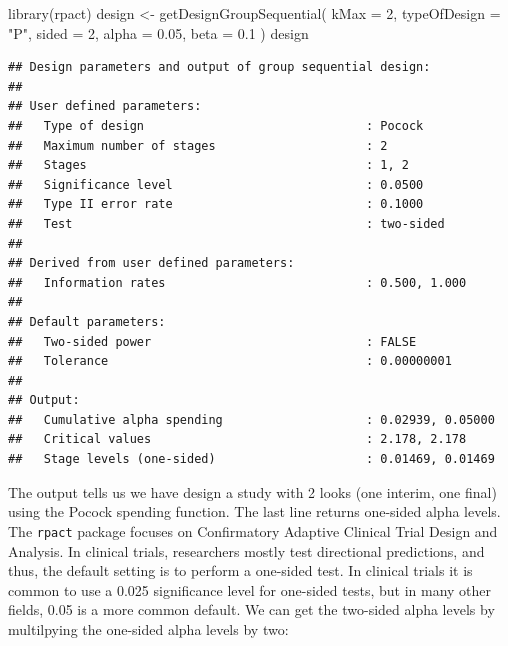 \documentclass[
  oneside]{book}
\newenvironment{Shaded}{\begin{snugshade}}{\end{snugshade}}
\newcommand{\AttributeTok}[1]{\textcolor[rgb]{0.77,0.63,0.00}{#1}}
\newcommand{\DecValTok}[1]{\textcolor[rgb]{0.00,0.00,0.81}{#1}}
\newcommand{\FloatTok}[1]{\textcolor[rgb]{0.00,0.00,0.81}{#1}}
\newcommand{\FunctionTok}[1]{\textcolor[rgb]{0.00,0.00,0.00}{#1}}
\newcommand{\NormalTok}[1]{#1}
\newcommand{\OtherTok}[1]{\textcolor[rgb]{0.56,0.35,0.01}{#1}}
\newcommand{\SpecialCharTok}[1]{\textcolor[rgb]{0.00,0.00,0.00}{#1}}
\newcommand{\StringTok}[1]{\textcolor[rgb]{0.31,0.60,0.02}{#1}}
\begin{document}
\begin{Shaded}
\begin{Highlighting}[]
\FunctionTok{library}\NormalTok{(rpact)}
\NormalTok{design }\OtherTok{\textless{}{-}} \FunctionTok{getDesignGroupSequential}\NormalTok{(}
  \AttributeTok{kMax =} \DecValTok{2}\NormalTok{,}
  \AttributeTok{typeOfDesign =} \StringTok{"P"}\NormalTok{,}
  \AttributeTok{sided =} \DecValTok{2}\NormalTok{,}
  \AttributeTok{alpha =} \FloatTok{0.05}\NormalTok{,}
  \AttributeTok{beta =} \FloatTok{0.1}
\NormalTok{)}
\NormalTok{design}
\end{Highlighting}
\end{Shaded}

\begin{verbatim}
## Design parameters and output of group sequential design:
## 
## User defined parameters:
##   Type of design                               : Pocock 
##   Maximum number of stages                     : 2 
##   Stages                                       : 1, 2 
##   Significance level                           : 0.0500 
##   Type II error rate                           : 0.1000 
##   Test                                         : two-sided 
## 
## Derived from user defined parameters:
##   Information rates                            : 0.500, 1.000 
## 
## Default parameters:
##   Two-sided power                              : FALSE 
##   Tolerance                                    : 0.00000001 
## 
## Output:
##   Cumulative alpha spending                    : 0.02939, 0.05000 
##   Critical values                              : 2.178, 2.178 
##   Stage levels (one-sided)                     : 0.01469, 0.01469
\end{verbatim}

The output tells us we have design a study with 2 looks (one interim, one final) using the Pocock spending function. The last line returns one-sided alpha levels. The \texttt{rpact} package focuses on Confirmatory Adaptive Clinical Trial Design and Analysis. In clinical trials, researchers mostly test directional predictions, and thus, the default setting is to perform a one-sided test. In clinical trials it is common to use a 0.025 significance level for one-sided tests, but in many other fields, 0.05 is a more common default. We can get the two-sided alpha levels by multilpying the one-sided alpha levels by two:

\begin{Shaded}
\end{Shaded}
\end{document}
